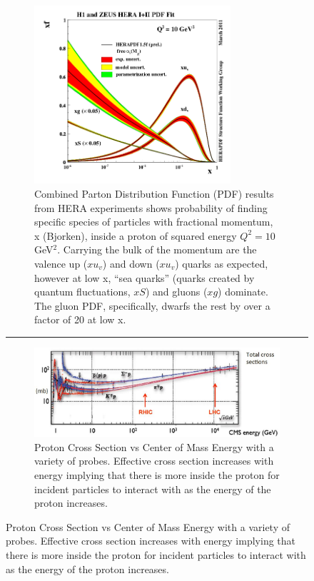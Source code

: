 \begin{figure}
\centering
\begin{subfigure}[p]{0.8\textwidth}
  \centering
    \includegraphics[width=0.8\textwidth]{prevplots/herapdf15f_alpha.png}
  \caption[H1 and ZEUS Parton Distribution Functions]{Combined Parton Distribution Function (PDF) results from HERA experiments\citep{Abramowicz2015} shows probability of finding specific species of particles with fractional momentum, x (Bjorken), inside a proton of squared energy $Q^2 = 10$ GeV$^2$. Carrying the bulk of the momentum are the valence up ($xu_v$) and down ($xu_v$) quarks as expected, however at low x, ``sea quarks'' (quarks created by quantum fluctuations, $xS$) and gluons ($xg$) dominate. The gluon PDF, specifically, dwarfs the rest by over a factor of 20 at low x.}
  \label{fig:HERAPDF}
\end{subfigure}
    \rule{35em}{0.5pt}
\begin{subfigure}[p]{0.8\textwidth}
  \centering
    \includegraphics[width=1\textwidth]{prevplots/protoncrosssection.JPG}
  \caption[Proton Cross Section vs Center of Mass Energy.]{Proton Cross Section vs Center of Mass Energy with a variety of probes\citep{PDGcrosssection}\citep{Itakura2012}. Effective cross section increases with energy implying that there is more inside the proton for incident particles to interact with as the energy of the proton increases.}
  \label{fig:PDGxsection}
\end{subfigure}
\end{figure}

